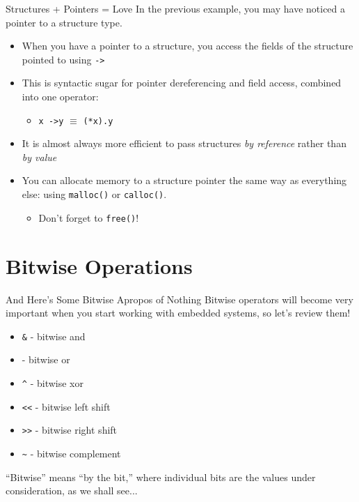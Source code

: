 \documentclass[11pt]{beamer}
\begin{document}
\begin{frame}{Structures + Pointers = Love}
In the previous example, you may have noticed a pointer to a structure type.
\begin{itemize}
\item When you have a pointer to a structure, you access the fields of the structure pointed to using \texttt{-\textgreater}
\item This is syntactic sugar for pointer dereferencing and field access, combined into one operator:
\begin{itemize}
\item \texttt{x -\textgreater y} $\equiv$ \texttt{(*x).y}
\end{itemize}
\item It is almost always more efficient to pass structures \emph{by reference} rather than \emph{by value}
\item You can allocate memory to a structure pointer the same way as everything else: using \texttt{malloc()} or \texttt{calloc()}.
\begin{itemize}
\item Don't forget to \texttt{free()}!
\end{itemize}
\end{itemize}
\end{frame}

\section[Bitwise]{Bitwise Operations}
\begin{frame}{And Here's Some Bitwise Apropos of Nothing}
Bitwise operators will become very important when you start working with embedded systems, so let's review them! 
\begin{itemize}
\item \texttt{\&} - bitwise and
\item \texttt{\textbar} - bitwise or
\item \texttt{\textasciicircum} - bitwise xor
\item \texttt{\textless\textless} - bitwise left shift
\item \texttt{\textgreater\textgreater} - bitwise right shift
\item \texttt{\textasciitilde} - bitwise complement
\end{itemize}
``Bitwise'' means ``by the bit,'' where individual bits are the values under consideration, as we shall see...
\end{frame}
\end{document}
